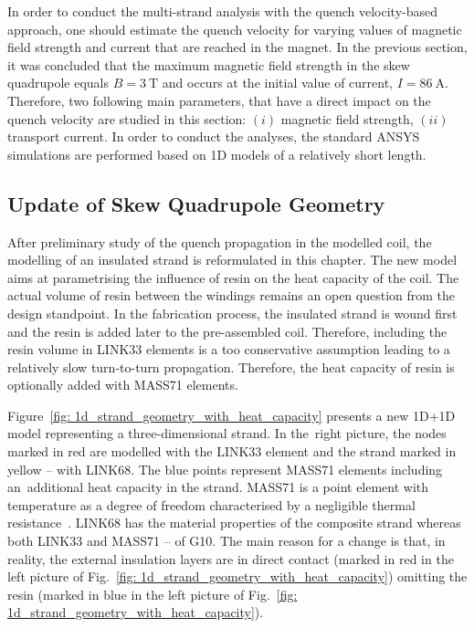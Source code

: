 
In order to conduct the multi-strand analysis with the quench velocity-based approach, one should estimate the quench velocity for varying values of magnetic field strength and current that are reached in the magnet. In the previous section, it was concluded that the maximum magnetic field strength in the skew quadrupole equals $B=3~\text{T}$ and occurs at the initial value of current, $I=86~\text{A}$. Therefore, two following main parameters, that have a direct impact on the quench velocity are studied in this section: $(i)$ magnetic field strength, $(ii)$ transport current. In order to conduct the analyses, the standard ANSYS simulations are performed based on 1D models of a relatively short length.

\subsection{Update of Skew Quadrupole Geometry}
\label{subsection:update_skew_quadrupole_geometry}

After preliminary study of the quench propagation in the modelled coil, the modelling of an insulated strand is reformulated in this chapter. The new model aims at parametrising the influence of resin on the heat capacity of the coil. The actual volume of resin between the windings remains an open question from the design standpoint. In the fabrication process, the insulated strand is wound first and the resin is added later to the pre-assembled coil. Therefore, including the resin volume in LINK33 elements is a too conservative assumption leading to a relatively slow turn-to-turn propagation. Therefore, the heat capacity of resin is optionally added with MASS71 elements.

Figure~\ref{fig: 1d_strand_geometry_with_heat_capacity} presents a new 1D+1D model representing a three-dimensional strand. In the~right picture, the nodes marked in red are modelled with the LINK33 element and the strand marked in yellow -- with LINK68. The blue points represent MASS71 elements including an~additional heat capacity in the strand. MASS71 is a point element with temperature as a degree of freedom characterised by a negligible thermal resistance~\cite{ansys_element_manual}. LINK68 has the material properties of the composite strand whereas both LINK33 and MASS71 -- of G10. The main reason for a change is that, in reality, the external insulation layers are in direct contact (marked in red in the left picture of Fig.~\ref{fig: 1d_strand_geometry_with_heat_capacity}) omitting the resin (marked in blue in the left picture of Fig.~\ref{fig: 1d_strand_geometry_with_heat_capacity}). 

